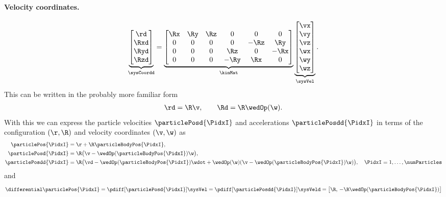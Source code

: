 \paragraph{Velocity coordinates.}
\begin{align}\label{eq:KinematicsRigidBody}
 \underbrace{\begin{bmatrix} \rd \\ \Rxd \\ \Ryd \\ \Rzd  \end{bmatrix}}_{\sysCoordd}
 = 
 \underbrace{\begin{bmatrix}
  \Rx & \Ry & \Rz & 0 & 0 & 0 \\
  0 & 0 & 0 & 0 & -\Rz & \Ry \\
  0 & 0 & 0 & \Rz & 0 & -\Rx \\
  0 & 0 & 0 & -\Ry & \Rx & 0
 \end{bmatrix}}_{\kinMat}
 \underbrace{\begin{bmatrix} \vx \\ \vy \\ \vz \\ \wx \\ \wy \\ \wz \end{bmatrix}}_{\sysVel}
 .
\end{align}
This can be written in the probably more familiar form
\begin{align}
 \rd = \R \v, \qquad \Rd = \R \wedOp(\w).
\end{align}
With this we can express the particle velocities $\particlePosd{\PidxI}$ and accelerations $\particlePosdd{\PidxI}$ in terms of the configuration $(\r, \R)$ and velocity coordinates $(\v, \w)$ as
\begin{subequations}
\begin{align}
 \label{eq:RBParticlePos}
 \particlePos{\PidxI} &= \r + \R \particleBodyPos{\PidxI},
\\
 \label{eq:RBParticleVel}
 \particlePosd{\PidxI} &= \R \big( \v - \wedOp(\particleBodyPos{\PidxI}) \w \big),
\\
 \label{eq:RBParticleAcc}
 \particlePosdd{\PidxI} &= \R \big( \vd - \wedOp(\particleBodyPos{\PidxI})\wdot + \wedOp(\w)(\v - \wedOp(\particleBodyPos{\PidxI})\w) \big), \quad \PidxI=1,\ldots,\numParticles
\end{align}
\end{subequations}
and
\begin{align}
 \differential \particlePos{\PidxI} = \pdiff[\particlePosd{\PidxI}]{\sysVel} = \pdiff[\particlePosdd{\PidxI}]{\sysVeld} = \big[ \R, \, -\R\wedOp(\particleBodyPos{\PidxI})\big] 
\end{align}


